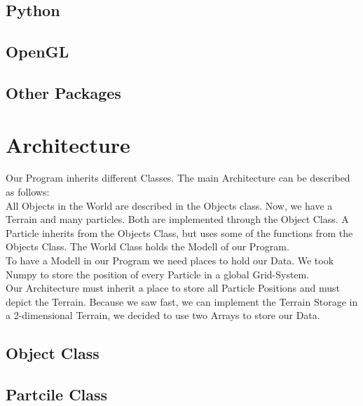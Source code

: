 \documentclass{sig-alternate-05-2015}
\begin{document}
\subsection{Python}
\subsection{OpenGL}
\subsection{Other Packages}
\section{Architecture}
Our Program inherits different Classes. The main Architecture can be described as follows:\\
All Objects in the World are described in the Objects class. Now, we have a Terrain and many particles. Both are implemented through the Object Class. A Particle inherits from the Objects Class, but uses some of the functions from the Objects Class. The World Class holds the Modell of our Program. \\
To have a Modell in our Program we need places to hold our Data. We took Numpy to store the position of every Particle in a global Grid-System.\\
Our Architecture must inherit a place to store all Particle Positions and must depict the Terrain. Because we saw fast, we can implement the Terrain Storage in a 2-dimensional Terrain, we decided to use two Arrays to store our Data. \\
\subsection{Object Class}
\subsection{Partcile Class}
\end{document}

